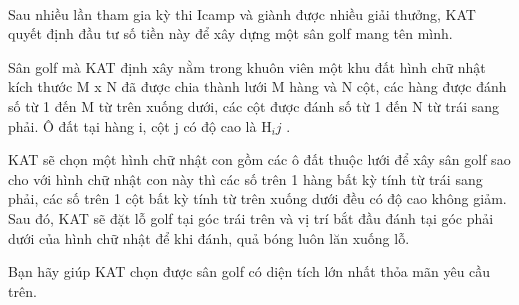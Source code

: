 

Sau nhiều lần tham gia kỳ thi Icamp và giành được nhiều giải thưởng, KAT quyết định đầu tư số tiền này để xây dựng một sân golf mang tên mình.

Sân golf mà KAT định xây nằm trong khuôn viên một khu đất hình chữ nhật kích thước M x N đã được chia thành lưới M hàng và N cột, các hàng được đánh số từ 1 đến M từ trên xuống dưới, các cột được đánh số từ 1 đến N từ trái sang phải. Ô đất tại hàng i, cột j có độ cao là H$_ij $ .

KAT sẽ chọn một hình chữ nhật con gồm các ô đất thuộc lưới để xây sân golf sao cho với hình chữ nhật con này thì các số trên 1 hàng bất kỳ tính từ trái sang phải, các số trên 1 cột bất kỳ tính từ trên xuống dưới đều có độ cao không giảm. Sau đó, KAT sẽ đặt lỗ golf tại góc trái trên và vị trí bắt đầu đánh tại góc phải dưới của hình chữ nhật để khi đánh, quả bóng luôn lăn xuống lỗ.

Bạn hãy giúp KAT chọn được sân golf có diện tích lớn nhất thỏa mãn yêu cầu trên.